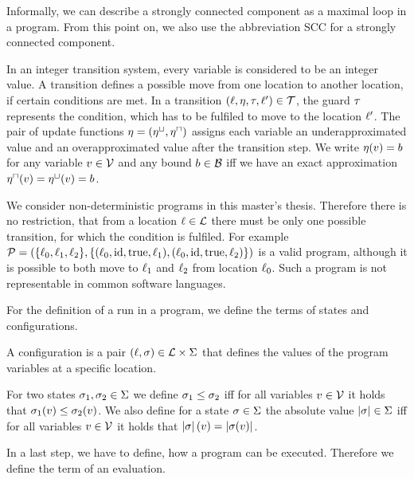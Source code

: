 Informally, we can describe a strongly connected component as a maximal loop in a program.
From this point on, we also use the abbreviation SCC for a strongly connected component.

In an integer transition system, every variable is considered to be an integer value.
A transition defines a possible move from one location to another location, if certain conditions are met.
In a transition $(\ell,\eta,\tau,\ell') \in \mathcal{T}$, the guard $\tau$ represents the condition, which has to be fulfiled to move to the location $\ell'$.
The pair of update functions $\eta = (\eta^\sqcup, \eta^\sqcap)$ assigns each variable an underapproximated value and an overapproximated value after the transition step.
We write $\eta(v) = b$ for any variable $v \in \mathcal{V}$ and any bound $b \in \mathcal{B}$ iff we have an exact approximation $\eta^\sqcap(v) = \eta^\sqcup(v) = b$.

We consider non-deterministic programs in this master's thesis.
Therefore there is no restriction, that from a location $\ell \in \mathcal{L}$ there must be only one possible transition, for which the condition is fulfiled.
For example $\mathcal{P} = (\lbrace \ell_0,\ell_1,\ell_2 \rbrace,\lbrace (\ell_0,\text{id},\text{true},\ell_1),(\ell_0,\text{id},\text{true},\ell_2) \rbrace)$ is a valid program, although it is possible to both move to $\ell_1$ and $\ell_2$ from location $\ell_0$.
Such a program is not representable in common software languages.

For the definition of a run in a program, we define the terms of states and configurations.

\begin{definition}[Configuration] 
  A configuration is a pair $(\ell, \sigma) \in \mathcal{L} \times \Sigma$ that defines the values of the program variables at a specific location.
\end{definition}

For two states $\sigma_1, \sigma_2 \in \Sigma$ we define $\sigma_1 \leq \sigma_2$ iff for all variables $v \in \mathcal{V}$ it holds that $\sigma_1(v) \leq \sigma_2(v)$.
We also define for a state $\sigma \in \Sigma$ the absolute value $\left|\sigma\right| \in \Sigma$ iff for all variables $v \in \mathcal{V}$ it holds that $\left|\sigma\right|(v) = \left|\sigma(v)\right|$.

In a last step, we have to define, how a program can be executed.
Therefore we define the term of an evaluation.

